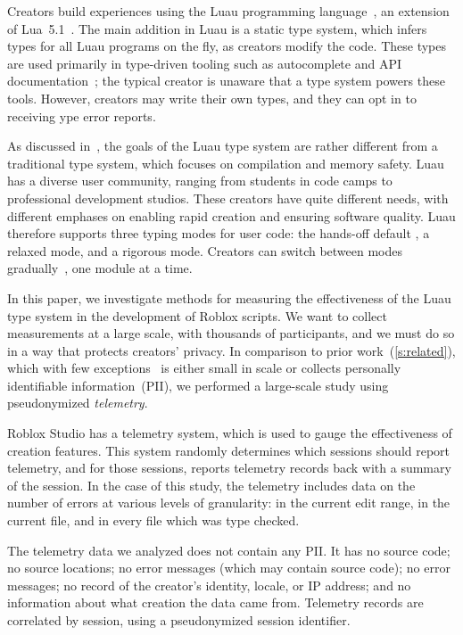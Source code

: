 \documentclass[english,submission,cleveref]{programming}
\begin{document}
Creators build experiences using the
{Luau} programming language~\cite{luau-lang.org},
an extension of {Lua~5.1~\cite{lua}}.
The main addition in Luau is a static type system, which infers
types for all Luau programs on the fly, as creators modify the code.
These types are used primarily in type-driven tooling such as autocomplete and
API documentation~\cite{luau-autocomplete}; the typical creator is unaware
that a type system powers these tools.
However, creators may write their own types, and they can opt in
to receiving ype error reports.

As discussed in~\cite{bfj-hatra-2021},
the goals of the {Luau} type system are rather different from
a traditional type system, which focuses on compilation and memory safety.
{Luau} has a diverse user community, ranging from
students in code camps to professional development studios. These
creators have quite different needs, with different emphases on
enabling rapid creation and ensuring software quality.
{Luau} therefore supports three typing modes for user code:
the hands-off default \mnocheck{},
a relaxed \mnonstrict{} mode,
and a rigorous \mstrict{} mode.
Creators can switch between modes
gradually~\cite{st-sfp-2006,tfffgksst-snapl-2017}, one module at a time.

In this paper, we investigate methods for measuring the effectiveness
of the {Luau} type system in the development of {Roblox} scripts.
We want to collect measurements at a large scale, with thousands
of participants, and we must do so in a way that protects creators' privacy.
In comparison to prior work~(\cref{s:related}), which
with few exceptions~\cite{zhlbr-cc-2020,zhlbr-oopsla-2020,hlzbr-ecoop-2021} is either small in scale
or collects personally identifiable information~(PII),
we performed a large-scale study using pseudonymized \emph{telemetry}.

{Roblox Studio} has a telemetry system, which is used to gauge
the effectiveness of creation features. This system randomly
determines which sessions should report telemetry, and for those
sessions, reports telemetry records back with a summary of the
session. In the case of this study, the telemetry includes data on the
number of errors at various levels of granularity: in the current edit
range, in the current file, and in every file which was type
checked.

The telemetry data we analyzed does not contain any PII.
It has no source code;
 no source locations;
no error messages (which may contain source code);
no error messages;
no record of the creator's identity, locale, or IP address;
and no information about what creation the data came from.
Telemetry records are correlated by session, using a pseudonymized
session identifier.
\end{document}

